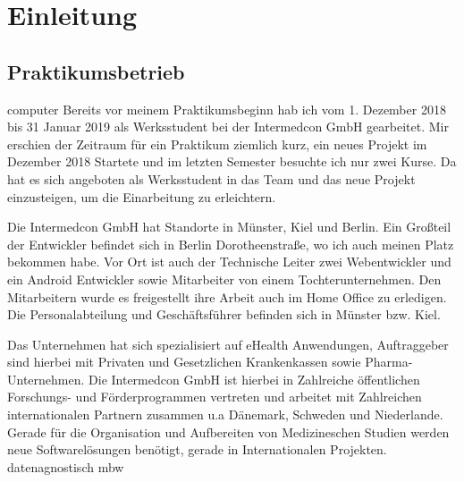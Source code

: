 \chapter{Einleitung}
\section{Praktikumsbetrieb}
\gls{computer}
Bereits vor meinem Praktikumsbeginn hab ich vom 1. Dezember 2018 bis 31 Januar 2019 als Werksstudent bei der Intermedcon GmbH gearbeitet. Mir erschien der Zeitraum für ein Praktikum ziemlich kurz, ein neues Projekt im Dezember 2018 Startete und  im letzten Semester besuchte ich nur zwei Kurse.  Da hat es sich  angeboten als Werksstudent in das Team und das neue Projekt einzusteigen, um die Einarbeitung zu erleichtern. 

Die Intermedcon GmbH hat Standorte in Münster, Kiel und Berlin. Ein Großteil der Entwickler befindet sich in Berlin Dorotheenstraße, wo ich auch meinen Platz bekommen habe. Vor Ort ist auch der Technische Leiter zwei Webentwickler und ein  Android  Entwickler sowie Mitarbeiter von einem Tochterunternehmen. Den Mitarbeitern wurde es freigestellt ihre Arbeit auch im Home Office zu erledigen. Die Personalabteilung und Geschäftsführer befinden sich in Münster bzw. Kiel. 

Das Unternehmen hat sich spezialisiert auf  eHealth Anwendungen, Auftraggeber sind hierbei mit Privaten und Gesetzlichen Krankenkassen sowie Pharma-Unternehmen. Die Intermedcon GmbH ist hierbei in Zahlreiche öffentlichen Forschungs- und Förderprogrammen vertreten und arbeitet mit Zahlreichen internationalen Partnern zusammen u.a Dänemark, Schweden und Niederlande. Gerade für die Organisation und Aufbereiten von Medizineschen Studien werden neue Softwarelösungen benötigt, gerade in Internationalen Projekten.
\gls{datenagnostisch}
\gls{mbw}



